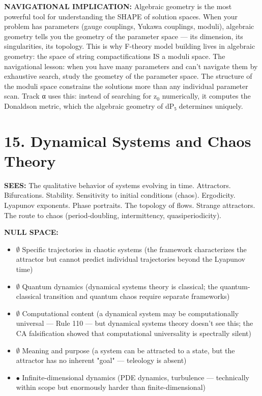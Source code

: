 \textbf{NAVIGATIONAL IMPLICATION:} Algebraic geometry is the most powerful tool for understanding the SHAPE of solution spaces. When your problem has parameters (gauge couplings, Yukawa couplings, moduli), algebraic geometry tells you the geometry of the parameter space — its dimension, its singularities, its topology. This is why F-theory model building lives in algebraic geometry: the space of string compactifications IS a moduli space. The navigational lesson: when you have many parameters and can't navigate them by exhaustive search, study the geometry of the parameter space. The structure of the moduli space constrains the solutions more than any individual parameter scan. Track α uses this: instead of searching for z$_0$ numerically, it computes the Donaldson metric, which the algebraic geometry of dP₅ determines uniquely.


\bigskip\noindent\makebox[\textwidth]{\color{rulegray}\rule{5cm}{0.3pt}}\bigskip


\section*{15. Dynamical Systems and Chaos Theory}


\textbf{SEES:} The qualitative behavior of systems evolving in time. Attractors. Bifurcations. Stability. Sensitivity to initial conditions (chaos). Ergodicity. Lyapunov exponents. Phase portraits. The topology of flows. Strange attractors. The route to chaos (period-doubling, intermittency, quasiperiodicity).


\textbf{NULL SPACE:}

\begin{itemize}[nosep,leftmargin=*]
  \item $\emptyset$ Specific trajectories in chaotic systems (the framework characterizes the attractor but cannot predict individual trajectories beyond the Lyapunov time)
  \item $\emptyset$ Quantum dynamics (dynamical systems theory is classical; the quantum-classical transition and quantum chaos require separate frameworks)
  \item $\emptyset$ Computational content (a dynamical system may be computationally universal — Rule 110 — but dynamical systems theory doesn't see this; the CA falsification showed that computational universality is spectrally silent)
  \item $\emptyset$ Meaning and purpose (a system can be attracted to a state, but the attractor has no inherent "goal" — teleology is absent)
  \item $\bullet$ Infinite-dimensional dynamics (PDE dynamics, turbulence — technically within scope but enormously harder than finite-dimensional)
\end{itemize}


